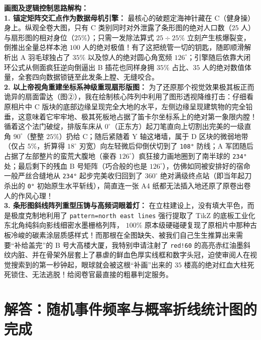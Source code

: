 \documentclass[12pt, a4paper]{ctexrep}
\begin{document}
\vspace{0.4cm}
{\small\color{blue!70!black}
\textbf{画图及逻辑控制思路解构：}\\
\textbf{1. 锚定矩阵交汇点作为数据母机引擎：} 最核心的破题定海神针藏在 C（健身操）身上。纵观全卷大图，只有 C 类别同时对外泄露了条形图的绝对人口数（$25$ 人）与扇形图的相对身位（$25\%$）；只需一发除法算式 $25 \div 25\%$ 立刻产生核爆裂变，倒推出全量总样本池 $100$ 人的绝对极值！有了这把统管一切的钥匙，随即顺滑解析出 A 羽毛球独占了 $35\%$ 以及惊人的绝对圆心角宽频 $126^\circ$；引擎随后依靠大闭环公式从侧面疯狂逆向倒逼出 B 插花也同样身拥 $35\%$ 占比、$35$ 人的绝对数值体量，全套四向数据锁链至此发条上膛、无缝咬合。\\
\textbf{2. 以上帝视角重建坐标系神级重现扇形版图：} 为了还原那个视觉效果极其板正而诡异的扇面雷达（图②），我在绘制核心阵列中利用了图形透视降维打击：仔细看原相片中 C 版块的底部边缘呈现完全大地的水平，左侧边缘呈现建筑物的完全铅垂，这意味着它牢牢地、极其死板地占据了笛卡尔坐标系上的绝对第一象限内膛！\\
循着这个法门破绽，排版车床从 $0^\circ$（正东方）起刀笔直向上切割出完美的一级直角 $90^\circ$（整整 $25\%$）扔给 C；随后紧随着 Y 轴这堵墙，属于 D 区块的微弱地带（仅占 $5\%$，折算得 $18^\circ$ 刃宽）向左轻微后仰倒伏切到了 \texttt{108°} 防线；A 军团随后占据了左部整片的蛮荒大腹地（豪吞 $126^\circ$）疯狂接力画地圈到了南半球的 \texttt{234°} 处；最后剩下的残血 B 号矩阵（巧合般的也是 $126^\circ$），仿佛如同被安排好的宿命一般严丝合缝地从 \texttt{234°} 起步完美收归回到了 $360^\circ$ 绝对满级终点站（即当年起刀杀出的 \texttt{0°} 初始原生水平斩线），简直连一张 A4 纸都无法插入地还原了原卷出卷人的作风心理！\\
\textbf{3. 条形图斜线阵列重型压铸与高频词眼着灯：} 在立柱建设上，没有填大平色，而是极度克制地利用了 \texttt{pattern=north east lines} 强行提取了 TikZ 的底板工业化东北角纯斜向影线细密水墨栅格列阵， $100\%$ 原本级硬碰硬复现了原相片中那种古板冷峻的碳素涂层质感样式！而那根在全图缺失、被我们自己生生推算出来需要“补给盖完”的 B 号大高楼大厦，我特别申请注射了 \texttt{red!60} 的高亮赤红油墨斜纹内脏、并在骨架外层套上了暴虐的鲜血色厚实线框和数字头冠，迫使审阅人在视觉搜索到的第一秒钟起，眼球就会被这根“补画”出来的 $35$ 楼高的绝对红血大柱死死锁住、无法逃脱！给阅卷官最直接的粗暴判定服务。
}

\newpage

\section{解答：随机事件频率与概率折线统计图的完成}
\end{document}
